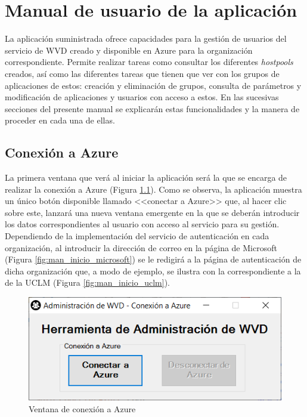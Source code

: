 \chapter{Manual de usuario de la aplicación}
\label{anx:manual}

La aplicación suministrada ofrece capacidades para la gestión de usuarios del servicio de \acf{WVD} creado y disponible en Azure para la organización correspondiente. Permite realizar tareas como consultar los diferentes \textit{hostpools} creados, así como las diferentes tareas que tienen que ver con los grupos de aplicaciones de estos: creación y eliminación de grupos, consulta de parámetros y modificación de aplicaciones y usuarios con acceso a estos. En las sucesivas secciones del presente manual se explicarán estas funcionalidades y la manera de proceder en cada una de ellas.

\section{Conexión a Azure}
La primera ventana que verá al iniciar la aplicación será la que se encarga de realizar la conexión a Azure (Figura \ref{fig:man_main_conex}). Como se observa, la aplicación muestra un único botón disponible llamado <<conectar a Azure>> que, al hacer clic sobre este, lanzará una nueva ventana emergente en la que se deberán introducir los datos correspondientes al usuario con acceso al servicio para su gestión. Dependiendo de la implementación del servicio de autenticación en cada organización, al introducir la dirección de correo en la página de Microsoft (Figura \ref{fig:man_inicio_microsoft}) se le redigirá a la página de autenticación de dicha organización que, a modo de ejemplo, se ilustra con la correspondiente a la de la \acf{UCLM} (Figura \ref{fig:man_inicio_uclm}).

\begin{figure}[h]
  \centering
  \includegraphics[width=0.7\linewidth]{figures/images/script/main_conex.PNG}
  \caption{Ventana de conexión a Azure}
  \label{fig:man_main_conex}
\end{figure}

